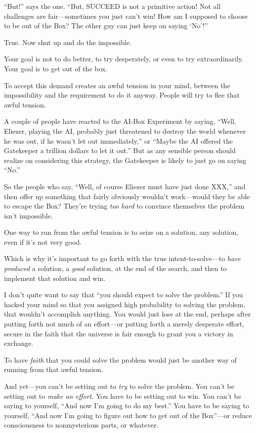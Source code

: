 {
 ``But!'' says the one.
``But, SUCCEED is not a primitive action! Not all
challenges are fair---sometimes you just can't win! How
am I supposed to choose to be out of the Box? The other guy can just
keep on saying
`No'!''}

{
 True. Now shut up and do the impossible.}

{
 Your goal is not to do better, to try desperately, or even to try
extraordinarily. Your goal is to get out of the box.}

{
 To accept this demand creates an awful tension in your mind,
between the impossibility and the requirement to do it anyway. People
will try to flee that awful tension.}

{
 A couple of people have reacted to the AI-Box Experiment by
saying, ``Well, Eliezer, playing the AI, probably just
threatened to destroy the world whenever he was out, if he
wasn't let out immediately,'' or
``Maybe the AI offered the Gatekeeper a trillion
dollars to let it out.'' But as any sensible person
should realize on considering this strategy, the Gatekeeper is likely
to just go on saying ``No.''}

{
 So the people who say, ``Well, of course Eliezer
must have just done XXX,'' and then offer up
something that fairly obviously wouldn't work---would
they be able to escape the Box? They're trying
\textit{too hard} to convince themselves the problem
isn't impossible.}

{
 One way to run from the awful tension is to seize on a solution,
any solution, even if it's not very good.}

{
 Which is why it's important to go forth with the
true intent-to-solve---to \textit{have produced} a solution, a
\textit{good} solution, at the end of the search, and then to implement
that solution and win.}

{
 I don't quite want to say that
``you should expect to solve the
problem.'' If you hacked your mind so that you
assigned high probability to solving the problem, that
wouldn't accomplish anything. You would just lose at
the end, perhaps after putting forth not much of an effort---or putting
forth a merely desperate effort, secure in the faith that the universe
is fair enough to grant you a victory in exchange.}

{
 To have \textit{faith} that you could solve the problem would just
be another way of running from that awful tension.}

{
 And yet---you can't be setting out to \textit{try}
to solve the problem. You can't be setting out to
\textit{make an effort.} You have to be setting out to win. You
can't be saying to yourself, ``And now
I'm going to do my best.'' You have
to be saying to yourself, ``And now
I'm going to figure out how to get out of the
Box''---or reduce consciousness to nonmysterious
parts, or whatever.}

